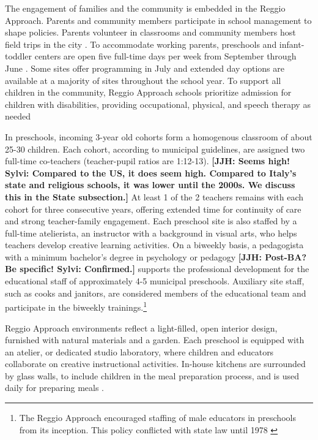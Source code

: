 The engagement of families and the community is embedded in the Reggio Approach. Parents and community members participate in school management to shape policies. Parents volunteer in classrooms and community members host field trips in the city \citep{CEHD_2016_Historical-Analysis,Cagliari-etal-eds_2016_BOOK_Loris-Malaguzzi}. To accommodate working parents, preschools and infant-toddler centers are open five full-time days per week from September through June \citep{Giudici-Nicolosi_2014_Reggio-Approach}. Some sites offer programming in July and extended day options are available at a majority of sites throughout the school year. To support all children in the community, Reggio Approach schools prioritize admission for children with disabilities, providing occupational, physical, and speech therapy as needed \citep{Edwards-etal-eds_1998_Hundred-Languages,Giaroni_1972_Regulations-Municipal-EC-Schools}

In preschools, incoming 3-year old cohorts form a homogenous classroom of about 25-30 children. Each cohort, according to municipal guidelines, are assigned two full-time co-teachers (teacher-pupil ratios are 1:12-13). \textbf{[JJH: Seems high! Sylvi: Compared to the US, it does seem high. Compared to Italy's state and religious schools, it was lower until the 2000s. We discuss this in the State subsection.]} At least 1 of the 2 teachers remains with each cohort for three consecutive years, offering extended time for continuity of care and strong teacher-family engagement. Each preschool site is also staffed by a full-time atelierista, an instructor with a background in visual arts, who helps teachers develop creative learning activities. On a biweekly basis, a pedagogista with a minimum bachelor's degree in psychology or pedagogy \textbf{[JJH: Post-BA? Be specific! Sylvi: Confirmed.]} supports the professional development for the educational staff of approximately 4-5 municipal preschools. Auxiliary site staff, such as cooks and janitors, are considered members of the educational team and participate in the biweekly trainings.\footnote{The Reggio Approach encouraged staffing of male educators in preschools from its inception. This policy conflicted with state law until 1978 \citep{Hohnerlein_2015_Development-and-Diffusion.}}

Reggio Approach environments reflect a light-filled, open interior design, furnished with natural materials and a garden. Each preschool is equipped with an atelier, or dedicated studio laboratory, where children and educators collaborate on creative instructional activities. In-house kitchens are surrounded by glass walls, to include children in the meal preparation process, and is used daily for preparing meals \citep{Rinaldi_2006_ReggioEmilia_BOOK,Vecchi_2010_ReggioEmilia_BOOK}. 

